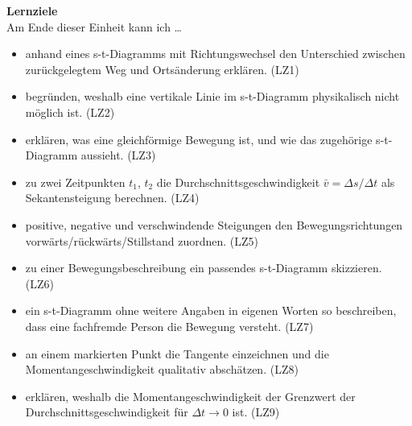 \begin{infobox}
\textbf{Lernziele}\\
Am Ende dieser Einheit kann ich \dots
\begin{itemize}[leftmargin=1.2cm,itemsep=0.4em]
  \item anhand eines s-t-Diagramms mit Richtungswechsel den Unterschied zwischen zurückgelegtem Weg und Ortsänderung erklären. (LZ1)
  \item begründen, weshalb eine vertikale Linie im s-t-Diagramm physikalisch nicht möglich ist. (LZ2)
  \item erklären, was eine gleichförmige Bewegung ist, und wie das zugehörige s-t-Diagramm aussieht. (LZ3)
  \item zu zwei Zeitpunkten $t_1$, $t_2$ die Durchschnittsgeschwindigkeit $\bar v = \Delta s/\Delta t$ als Sekantensteigung berechnen. (LZ4)
  \item positive, negative und verschwindende Steigungen den Bewegungsrichtungen vorwärts/rückwärts/Stillstand zuordnen. (LZ5)
  \item zu einer Bewegungsbeschreibung ein passendes s-t-Diagramm skizzieren. (LZ6)
  \item ein s-t-Diagramm ohne weitere Angaben in eigenen Worten so beschreiben, dass eine fachfremde Person die Bewegung versteht. (LZ7)
  \item an einem markierten Punkt die Tangente einzeichnen und die Momentangeschwindigkeit qualitativ abschätzen. (LZ8)
  \item erklären, weshalb die Momentangeschwindigkeit der Grenzwert der Durchschnittsgeschwindigkeit für $\Delta t \to 0$ ist. (LZ9)
\end{itemize}
\end{infobox}

